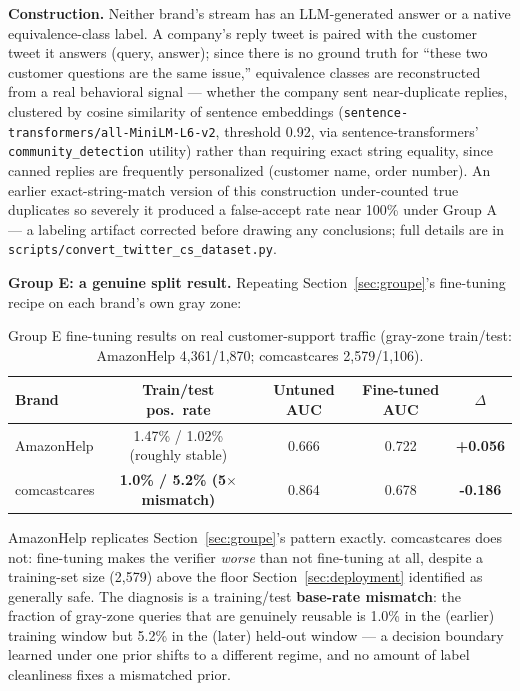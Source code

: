 \documentclass[11pt]{article}
\newenvironment{fittab}{\begin{lrbox}{\fittabbox}}{\end{lrbox}%
  \ifdim\wd\fittabbox>\linewidth\resizebox{\linewidth}{!}{\usebox{\fittabbox}}\else\usebox{\fittabbox}\fi}
\begin{document}
\textbf{Construction.} Neither brand's stream has an LLM-generated answer or a native equivalence-class label. A company's reply tweet is paired with the customer tweet it answers (query, answer); since there is no ground truth for ``these two customer questions are the same issue,'' equivalence classes are reconstructed from a real behavioral signal --- whether the company sent near-duplicate replies, clustered by cosine similarity of sentence embeddings (\texttt{sentence-transformers/\allowbreak{}all-Mini\allowbreak{}LM-L6-v2}, threshold 0.92, via sentence-transformers' \texttt{community\_\allowbreak{}detection} utility) rather than requiring exact string equality, since canned replies are frequently personalized (customer name, order number). An earlier exact-string-match version of this construction under-counted true duplicates so severely it produced a false-accept rate near 100\% under Group A --- a labeling artifact corrected before drawing any conclusions; full details are in \texttt{scripts/\allowbreak{}convert\_\allowbreak{}twitter\_\allowbreak{}cs\_\allowbreak{}dataset.\allowbreak{}py}.

\textbf{Group E: a genuine split result.} Repeating Section~\ref{sec:groupe}'s fine-tuning recipe on each brand's own gray zone:

\begin{table}[h]
\centering
\small
\begin{fittab}\begin{tabular}{@{}lcccc@{}}
\toprule
\textbf{Brand} & \textbf{Train/test pos.\ rate} & \textbf{Untuned AUC} & \textbf{Fine-tuned AUC} & \textbf{$\Delta$} \\
\midrule
AmazonHelp & 1.47\% / 1.02\% (roughly stable) & 0.666 & 0.722 & \textbf{+0.056} \\
comcastcares & \textbf{1.0\% / 5.2\% (5$\times$ mismatch)} & 0.864 & 0.678 & \textbf{-0.186} \\
\bottomrule
\end{tabular}\end{fittab}
\caption{Group E fine-tuning results on real customer-support traffic (gray-zone train/test: AmazonHelp 4{,}361/1{,}870; comcastcares 2{,}579/1{,}106).}
\end{table}

AmazonHelp replicates Section~\ref{sec:groupe}'s pattern exactly. comcastcares does not: fine-tuning makes the verifier \emph{worse} than not fine-tuning at all, despite a training-set size (2,579) above the floor Section~\ref{sec:deployment} identified as generally safe. The diagnosis is a training/test \textbf{base-rate mismatch}: the fraction of gray-zone queries that are genuinely reusable is 1.0\% in the (earlier) training window but 5.2\% in the (later) held-out window --- a decision boundary learned under one prior shifts to a different regime, and no amount of label cleanliness fixes a mismatched prior.
\end{document}
